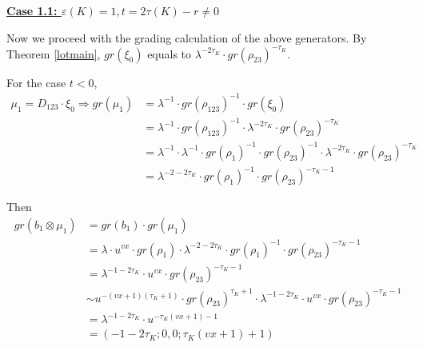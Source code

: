 \documentclass[11pt,reqno]{amsart}
\theoremstyle{definition}
\newtheorem *{remark}{Remark}
\begin{document}
\begin{subsection}{\underline{\textbf{Case 1.1: $\varepsilon(K)=1, t = 2 \tau(K) - r \neq 0$}}}



Now we proceed with the grading calculation of the above generators. By Theorem \ref{lotmain}, $gr(\xi_0)$ equals to $\lambda^{-2\tau_K} \cdot gr(\rho_{23})^{-\tau_K}$.

For the case  $t < 0$,
\begin{align*}
    \mu_1 = D_{123}\cdot \xi_0 \Rightarrow gr(\mu_1) &= \lambda^{-1} \cdot gr(\rho_{123})^{-1}\cdot gr(\xi_0) \\
   &= \lambda^{-1} \cdot gr(\rho_{123})^{-1} \cdot \lambda^{-2\tau_K} \cdot gr(\rho_{23})^{-\tau_K} \\
   &= \lambda^{-1} \cdot \lambda^{-1} \cdot gr(\rho_1)^{-1} \cdot gr(\rho_{23})^{-1} \cdot \lambda^{-2\tau_K} \cdot gr(\rho_{23})^{-\tau_K} \\
   & = \lambda^{-2-2\tau_K} \cdot gr(\rho_1)^{-1} \cdot gr(\rho_{23})^{-\tau_K-1}
   \end{align*}
   
Then
\begin{align*}
    gr(b_1 \otimes \mu_1) &= gr(b_1) \cdot gr(\mu_1) \\
    &= \lambda \cdot u^{vx} \cdot gr(\rho_{1}) \cdot  \lambda^{-2-2\tau_K} \cdot gr(\rho_1)^{-1} \cdot gr(\rho_{23})^{-\tau_K-1}\\
    & = \lambda^{-1-2\tau_K} \cdot u^{vx} \cdot  gr(\rho_{23})^{-\tau_K-1} \\
    & \sim u^{-(vx+1)(\tau_K+1)} \cdot gr(\rho_{23})^{\tau_K+1} \cdot \lambda^{-1-2\tau_K} \cdot u^{vx} \cdot  gr(\rho_{23})^{-\tau_K-1}\\
    & = \lambda^{-1-2\tau_K} \cdot u^{-\tau_K(vx+1) - 1}\\
    &= (-1-2\tau_K;0,0;\tau_K(vx+1)+1)
\end{align*}







\end{subsection}
\end{document}
